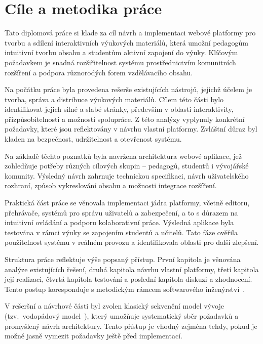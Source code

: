 \chapter*{Cíle a metodika práce}

Tato diplomová práce si klade za cíl návrh a implementaci webové platformy pro tvorbu a sdílení interaktivních výukových materiálů, která umožní pedagogům intuitivní tvorbu obsahu a studentům aktivní zapojení do výuky. 
Klíčovým požadavkem je snadná rozšiřitelnost systému prostřednictvím komunitních rozšíření a podpora různorodých forem vzdělávacího obsahu.

Na počátku práce byla provedena rešerše existujících nástrojů, jejichž účelem je tvorba, správa a distribuce výukových materiálů. 
Cílem této části bylo identifikovat jejich silné a slabé stránky, především v oblasti interaktivity, přizpůsobitelnosti a možnosti spolupráce. Z této analýzy vyplynuly konkrétní požadavky, které jsou reflektovány v návrhu vlastní platformy. Zvláštní důraz byl kladen na bezpečnost, udržitelnost a otevřenost systému.

Na základě těchto poznatků byla navržena architektura webové aplikace, jež zohledňuje potřeby různých cílových skupin -- pedagogů, studentů i vývojářské komunity.
Výsledný návrh zahrnuje technickou specifikaci, návrh uživatelského rozhraní, způsob vykreslování obsahu a možnosti integrace rozšíření.

Praktická část práce se věnovala implementaci jádra platformy, včetně editoru, přehrávače, systémů pro správu uživatelů a zabezpečení, a to s důrazem na intuitivní ovládání a podporu kolaborativní práce.
Výsledná aplikace byla testována v rámci výuky se zapojením studentů a učitelů.
Tato fáze ověřila použitelnost systému v reálném provozu a identifikovala oblasti pro další zlepšení.

Struktura práce reflektuje výše popsaný přístup. 
První kapitola je věnována analýze existujících řešení, druhá kapitola návrhu vlastní platformy, třetí kapitola její realizaci, čtvrtá kapitola testování a poslední kapitola diskuzi a zhodnocení. 
Tento postup koresponduje s metodickým rámcem softwarového inženýrství~\cite{laplante2007software}.

V rešeršní a návrhové části byl zvolen klasický sekvenční model vývoje (tzv.~vodopádový model~\cite{laplante2007software}), který umožňuje systematický sběr požadavků a promyšlený návrh architektury.
Tento přístup je vhodný zejména tehdy, pokud je možné jasně vymezit požadavky ještě před implementací.

